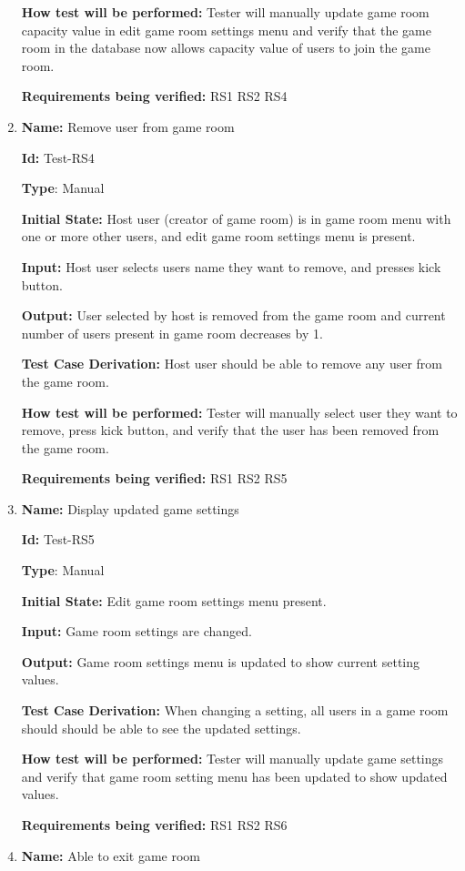 \documentclass[12pt, titlepage]{article}
\begin{document}
\begin{enumerate}
\textbf{How test will be performed:} Tester will manually update game room capacity value in edit game room settings menu and verify that the game room in the database now allows capacity value of users to join the game room.

\textbf{Requirements being verified: } RS1 RS2 RS4

\item{\textbf{Name:} Remove user from game room}

\textbf{Id:} Test-RS4

\textbf{Type}: Manual

\textbf{Initial State:} Host user (creator of game room) is in game room menu with one or more other users, and edit game room settings menu is present.

\textbf{Input:} Host user selects users name they want to remove, and presses kick button.

\textbf{Output:} User selected by host is removed from the game room and current number of users present in game room decreases by 1.

\textbf{Test Case Derivation:} Host user should be able to remove any user from the game room.

\textbf{How test will be performed:} Tester will manually select user they want to remove, press kick button, and verify that the user has been removed from the game room.

\textbf{Requirements being verified: } RS1 RS2 RS5

\item{\textbf{Name:} Display updated game settings}

\textbf{Id:} Test-RS5

\textbf{Type}: Manual

\textbf{Initial State:} Edit game room settings menu present.

\textbf{Input:} Game room settings are changed.

\textbf{Output:} Game room settings menu is updated to show current setting values.

\textbf{Test Case Derivation:} When changing a setting, all users in a game room should should be able to see the updated settings.

\textbf{How test will be performed:} Tester will manually update game settings and verify that game room setting menu has been updated to show updated values.

\textbf{Requirements being verified: } RS1 RS2 RS6

\item{\textbf{Name:} Able to exit game room}


\end{enumerate}
\end{document}
